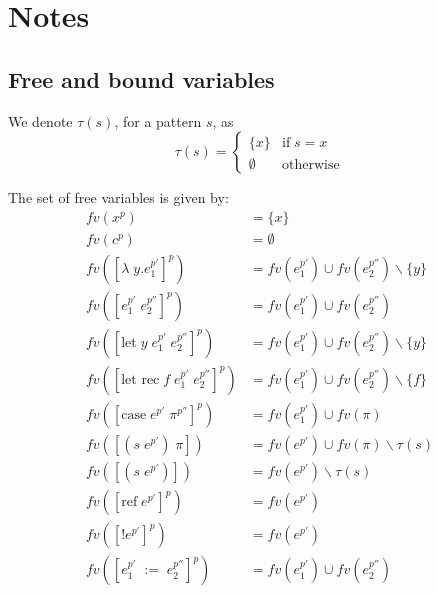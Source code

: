 \documentclass[../../master.tex]{subfiles}
\begin{document}
\section{Notes}

\subsection{Free and bound variables}
We denote $\tau(s)$, for a pattern $s$, as
$$
	\tau(s)=
		\left\{\begin{matrix}
			\{x\} & \mbox{if}\;s=x\\ 
			\emptyset & \mbox{otherwise}
		\end{matrix}\right.
$$

\begin{definition}
	The set of free variables is given by:
	\begin{align*}
		fv(x^p)&=\{x\}\\
		fv(c^p)&=\emptyset\\
		fv([\lambda\;y.e_1^{p'}]^p)&=fv(e_1^{p'})\cup fv(e_2^{p''})\backslash\{y\}\\
		fv([e_1^{p'}\;e_2^{p''}]^p)&=fv(e_1^{p'})\cup fv(e_2^{p''})\\
		fv([\mbox{let}\;y\;e_1^{p'}\;e_2^{p''}]^p)&=fv(e_1^{p'})\cup fv(e_2^{p''})\backslash\{y\}\\
		fv([\mbox{let rec}\;f\;e_1^{p'}\;e_2^{p''}]^p)&=fv(e_1^{p'})\cup fv(e_2^{p''})\backslash\{f\}\\
		fv([\mbox{case}\;e^{p'}\;\pi^{p''}]^p)&=fv(e_1^{p'})\cup fv(\pi)\\
		fv([(s\;e^{p'})\;\pi])&=fv(e^{p'})\cup fv(\pi)\backslash\tau(s)\\
		fv([(s\;e^{p'})])&=fv(e^{p'})\backslash\tau(s)\\
		fv([\mbox{ref}\;e^{p'}]^p)&=fv(e^{p'})\\
		fv([!e^{p'}]^p)&=fv(e^{p'})\\
		fv([e_1^{p'}\;:=\;e_2^{p''}]^p)&=fv(e_1^{p'})\cup fv(e_2^{p''})\\
	\end{align*}
\end{definition}
\end{document}
